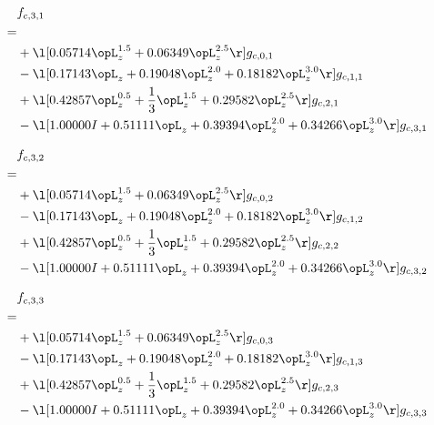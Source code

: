 \begin{alignat}{2} 
\label{eq:f_31_0} 
& f_{c,3,1} \nonumber \\ 
 = \\ 
& + \l[  0.05714 \opL_z^{1.5} +  0.06349 \opL_z^{2.5}  \r] g_{c,0,1} \nonumber \\ 
& - \l[  0.17143 \opL_z +  0.19048 \opL_z^{2.0} +  0.18182 \opL_z^{3.0}  \r] g_{c,1,1} \nonumber \\ 
& + \l[  0.42857 \opL_z^{0.5} + \frac{1}{3} \opL_z^{1.5} +  0.29582 \opL_z^{2.5}  \r] g_{c,2,1} \nonumber \\ 
& - \l[  1.00000 I +  0.51111 \opL_z +  0.39394 \opL_z^{2.0} +  0.34266 \opL_z^{3.0}  \r] g_{c,3,1} \nonumber \\ 
\end{alignat} 


\begin{alignat}{2} 
\label{eq:f_32_0} 
& f_{c,3,2} \nonumber \\ 
 = \\ 
& + \l[  0.05714 \opL_z^{1.5} +  0.06349 \opL_z^{2.5}  \r] g_{c,0,2} \nonumber \\ 
& - \l[  0.17143 \opL_z +  0.19048 \opL_z^{2.0} +  0.18182 \opL_z^{3.0}  \r] g_{c,1,2} \nonumber \\ 
& + \l[  0.42857 \opL_z^{0.5} + \frac{1}{3} \opL_z^{1.5} +  0.29582 \opL_z^{2.5}  \r] g_{c,2,2} \nonumber \\ 
& - \l[  1.00000 I +  0.51111 \opL_z +  0.39394 \opL_z^{2.0} +  0.34266 \opL_z^{3.0}  \r] g_{c,3,2} \nonumber \\ 
\end{alignat} 


\begin{alignat}{2} 
\label{eq:f_33_0} 
& f_{c,3,3} \nonumber \\ 
 = \\ 
& + \l[  0.05714 \opL_z^{1.5} +  0.06349 \opL_z^{2.5}  \r] g_{c,0,3} \nonumber \\ 
& - \l[  0.17143 \opL_z +  0.19048 \opL_z^{2.0} +  0.18182 \opL_z^{3.0}  \r] g_{c,1,3} \nonumber \\ 
& + \l[  0.42857 \opL_z^{0.5} + \frac{1}{3} \opL_z^{1.5} +  0.29582 \opL_z^{2.5}  \r] g_{c,2,3} \nonumber \\ 
& - \l[  1.00000 I +  0.51111 \opL_z +  0.39394 \opL_z^{2.0} +  0.34266 \opL_z^{3.0}  \r] g_{c,3,3} \nonumber \\ 
\end{alignat} 


